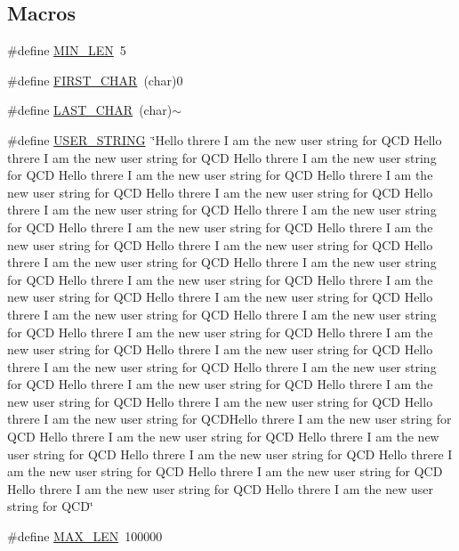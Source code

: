 \subsection*{Macros}
\begin{DoxyCompactItemize}
\item 
\#define \mbox{\hyperlink{adat-devel_2other__libs_2filedb_2filehash_2tdualwrite_8c_aa69f8dba9add1a52ce3cf7bcfafcfda0}{M\+I\+N\+\_\+\+L\+EN}}~5
\item 
\#define \mbox{\hyperlink{adat-devel_2other__libs_2filedb_2filehash_2tdualwrite_8c_af1c5fd90d1b8a22169133f549223f2e1}{F\+I\+R\+S\+T\+\_\+\+C\+H\+AR}}~(char)\textquotesingle{}0\textquotesingle{}
\item 
\#define \mbox{\hyperlink{adat-devel_2other__libs_2filedb_2filehash_2tdualwrite_8c_a31911f021a0d09eed9a5269d0648dfde}{L\+A\+S\+T\+\_\+\+C\+H\+AR}}~(char)\textquotesingle{}$\sim$\textquotesingle{}
\item 
\#define \mbox{\hyperlink{adat-devel_2other__libs_2filedb_2filehash_2tdualwrite_8c_a5fdc86a0c07ccece3ef65e2f46c0ffd4}{U\+S\+E\+R\+\_\+\+S\+T\+R\+I\+NG}}~\char`\"{}Hello threre I am the new user string for Q\+CD Hello threre I am the new user string for Q\+CD Hello threre I am the new user string for Q\+CD Hello threre I am the new user string for Q\+CD Hello threre I am the new user string for Q\+CD Hello threre I am the new user string for Q\+CD Hello threre I am the new user string for Q\+CD Hello threre I am the new user string for Q\+CD Hello threre I am the new user string for Q\+CD Hello threre I am the new user string for Q\+CD Hello threre I am the new user string for Q\+CD Hello threre I am the new user string for Q\+CD Hello threre I am the new user string for Q\+CD Hello threre I am the new user string for Q\+CD Hello threre I am the new user string for Q\+CD Hello threre I am the new user string for Q\+CD Hello threre I am the new user string for Q\+CD Hello threre I am the new user string for Q\+CD Hello threre I am the new user string for Q\+CD Hello threre I am the new user string for Q\+CD Hello threre I am the new user string for Q\+CD Hello threre I am the new user string for Q\+CD Hello threre I am the new user string for Q\+CD Hello threre I am the new user string for Q\+CD Hello threre I am the new user string for Q\+CD Hello threre I am the new user string for Q\+CD Hello threre I am the new user string for Q\+C\+D\+Hello threre I am the new user string for Q\+CD  Hello threre I am the new user string for Q\+CD Hello threre I am the new user string for Q\+CD Hello threre I am the new user string for Q\+CD Hello threre I am the new user string for Q\+CD Hello threre I am the new user string for Q\+CD Hello threre I am the new user string for Q\+CD Hello threre I am the new user string for Q\+CD\char`\"{}
\item 
\#define \mbox{\hyperlink{adat-devel_2other__libs_2filedb_2filehash_2tdualwrite_8c_aabf4f709c8199e41cf279c77112345fe}{M\+A\+X\+\_\+\+L\+EN}}~100000
\end{DoxyCompactItemize}
